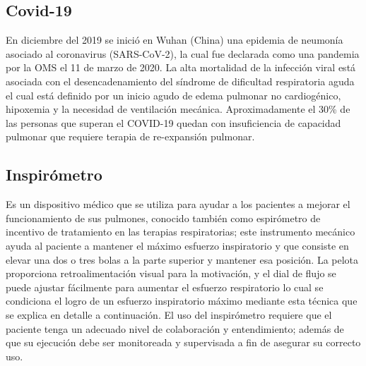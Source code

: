 \subsection{Covid-19}

En diciembre del 2019 se inici\'o en Wuhan (China) una epidemia de neumon\'ia asociado al coronavirus (SARS-CoV-2), la cual fue declarada como una pandemia por la OMS el 11 de marzo de 2020. La alta mortalidad de la infecci\'on viral est\'a asociada con el desencadenamiento del s\'indrome de dificultad respiratoria aguda el cual est\'a definido por un inicio agudo de edema pulmonar no cardiog\'enico, hipoxemia y la necesidad de ventilaci\'on mec\'anica. Aproximadamente el 30\% de las personas que superan el COVID-19 quedan con insuficiencia de capacidad pulmonar que requiere terapia de re-expansi\'on pulmonar\cite{3}.

\subsection{Inspir\'ometro}

Es un dispositivo m\'edico que se utiliza para ayudar a los pacientes a mejorar el funcionamiento de sus pulmones, conocido tambi\'en como espir\'ometro de incentivo de tratamiento en las terapias respiratorias;  este instrumento mec\'anico ayuda al paciente a mantener el m\'aximo esfuerzo inspiratorio y que consiste en elevar una dos o tres bolas a la parte superior y mantener esa posici\'on. La pelota proporciona retroalimentaci\'on visual para la motivaci\'on, y el dial de flujo se puede ajustar f\'acilmente para aumentar el esfuerzo respiratorio lo cual se condiciona el logro de un esfuerzo inspiratorio m\'aximo mediante esta t\'ecnica que se explica en detalle a continuaci\'on. El uso del inspir\'ometro  requiere que el paciente tenga un adecuado nivel de colaboraci\'on y entendimiento; adem\'as de que su ejecuci\'on debe ser monitoreada y supervisada a fin de asegurar su correcto uso\cite{22}.

